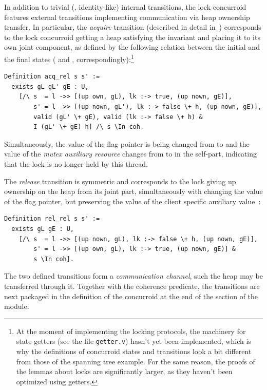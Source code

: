 In addition to trivial (\ie, identity-like) internal transitions, the
lock concurroid features external transitions implementing
communication via heap ownership transfer. In particular, the
\emph{acquire} transition (described in detail in~\cite[\S
4]{Nanevski-al:ESOP14}) corresponds to the lock concurroid getting a
heap satisfying the invariant  and placing it to
its own joint component, as defined by the following relation between
the initial and the final states ( and ,
correspondingly):\footnote{At the moment of implementing the locking
  protocols, the machinery for state getters (see the file
  \texttt{getter.v}) hasn't yet been implemented, which is why the
  definitions of concurroid states and transitions look a bit
  different from those of the spanning tree example. For the same
  reason, the proofs of the lemmas about locks are significantly
  larger, as they haven't been optimized using getters.}


\begin{lstlisting}
Definition acq_rel s s' :=  
  exists gL gL' gE : U, 
    [/\ s  = l ->> [(up own, gL), lk :-> true, (up nown, gE)],
        s' = l ->> [(up nown, gL'), lk :-> false \+ h, (up nown, gE)],
        valid (gL' \+ gE), valid (lk :-> false \+ h) &
        I (gL' \+ gE) h] /\ s \In coh.  
\end{lstlisting}

Simultaneously, the value of the flag pointer  is being
changed from  to  and the value of the
\emph{mutex auxiliary resource} changes from  to
 in the self-part, indicating that the lock is no
longer held by this thread.

The \emph{release} transition is symmetric and corresponds to the lock
giving up ownership on the heap  from its joint part,
simultaneously with changing the value of the flag pointer, but
preserving the value of the client specific auxiliary value~:

\begin{lstlisting}
Definition rel_rel s s' :=  
  exists gL gE : U, 
    [/\ s  = l ->> [(up nown, gL), lk :-> false \+ h, (up nown, gE)],
        s' = l ->> [(up own, gL), lk :-> true, (up nown, gE)] & 
        s \In coh].  
\end{lstlisting}

The two defined transitions form a \emph{communication channel}, such
the heap may be transferred through it. Together with the coherence
predicate, the transitions are next packaged in the definition of the
concurroid  at the end of the  section of
the  module.

